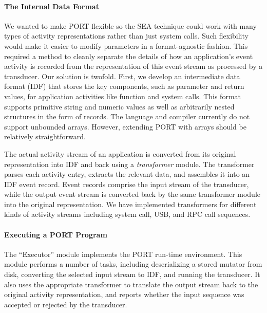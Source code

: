 \paragraph{The Internal Data Format}
 We wanted to make PORT flexible so the SEA technique
could
work with many types of
activity representations rather than just system calls.
Such flexibility would make it easier to modify parameters in a format-agnostic fashion.
This required a method to cleanly separate the details of how
an application's event activity is recorded from the representation of this event stream as
processed by a transducer.
Our solution is twofold.  First, we develop an intermediate data format
(IDF) that
stores the key components, such as parameter and return values,
for application activities like function
and system calls.  This format supports primitive string and numeric
values as well as arbitrarily nested structures in the form of records.
The language and compiler currently do not support unbounded arrays. However, extending PORT with arrays should be relatively straightforward.


The actual activity stream of an application is converted from its original representation into IDF and
back using a \emph{transformer} module. The transformer parses each activity entry,
extracts the relevant data, and assembles it into an IDF
event record.  Event records comprise the input stream of the transducer, while
the output event stream is converted back by the same transformer module
into the original  representation. We have implemented transformers for different kinds of activity streams including system call, USB, and RPC call sequences.

\paragraph{Executing a PORT Program}
The ``Executor'' module implements the PORT run-time environment.
This module performs a number of tasks, including deserializing a stored mutator from disk,
converting the selected input stream to IDF, and
running the transducer. It also
uses the appropriate transformer to translate the output stream back to the original activity representation, and reports whether the input sequence was
accepted or rejected by the transducer.

